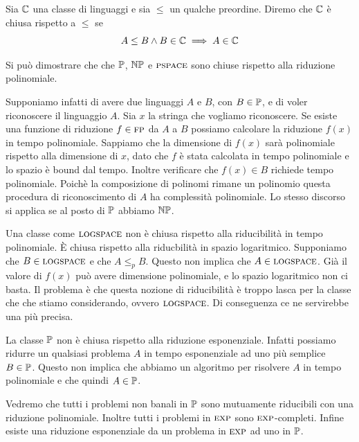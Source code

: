 
\begin{defn}
    Sia $\mathbb{C}$ una classe di linguaggi e sia $\leq$ un qualche preordine. Diremo che $\mathbb{C}$ è
    chiusa rispetto a $\leq$ se
    \begin{equation*}
        A \leq B \land B \in \mathbb{C} \implies A \in \mathbb{C}
    \end{equation*}
\end{defn}

Si può dimostrare che che $\mathbb{P}$, $\mathbb{NP}$ e $\textsc{pspace}$ sono chiuse rispetto alla riduzione
polinomiale.

Supponiamo infatti di avere due linguaggi $A$ e $B$, con $B \in \mathbb{P}$, e di voler riconoscere il
linguaggio $A$. Sia $x$ la stringa che vogliamo riconoscere. Se esiste una funzione di riduzione $f
\in \textsc{fp}$ da $A$ a $B$ possiamo calcolare la riduzione $f(x)$ in tempo polinomiale.  Sappiamo che la
dimensione di $f(x)$ sarà polinomiale rispetto alla dimensione di $x$, dato che $f$ è stata
calcolata in tempo polinomiale e lo spazio è bound dal tempo. Inoltre verificare che $f(x) \in B$
richiede tempo polinomiale. Poichè la composizione di polinomi rimane un polinomio questa procedura
di riconoscimento di $A$ ha complessità polinomiale. Lo stesso discorso si applica se al posto di
$\mathbb{P}$ abbiamo $\mathbb{NP}$.

Una classe come $\textsc{logspace}$ non è chiusa rispetto alla riducibilità in tempo polinomiale. È chiusa
rispetto alla riducbilità in spazio logaritmico. Supponiamo che $B \in \textsc{logspace}$ e che $A \leq_{p}
B$. Questo non implica che $A \in \textsc{logspace}$. Già il valore di $f(x)$ può avere dimensione
polinomiale, e lo spazio logaritmico non ci basta. Il problema è che questa nozione di riducibilità
è troppo lasca per la classe che che stiamo considerando, ovvero $\textsc{logspace}$. Di conseguenza ce ne
servirebbe una più precisa.

La classe $\mathbb{P}$ non è chiusa rispetto alla riduzione esponenziale. Infatti possiamo ridurre un
qualsiasi problema $A$ in tempo esponenziale ad uno più semplice $B \in \mathbb{P}$. Questo non
implica che abbiamo un algoritmo per risolvere $A$ in tempo polinomiale e che quindi $A \in
\mathbb{P}$.

Vedremo che tutti i problemi non banali in $\mathbb{P}$ sono mutuamente riducibili con una riduzione
polinomiale. Inoltre tutti i problemi in $\textsc{exp}$ sono $\textsc{exp}$-completi. Infine esiste una riduzione
esponenziale da un problema in $\textsc{exp}$ ad uno in $\mathbb{P}$.

